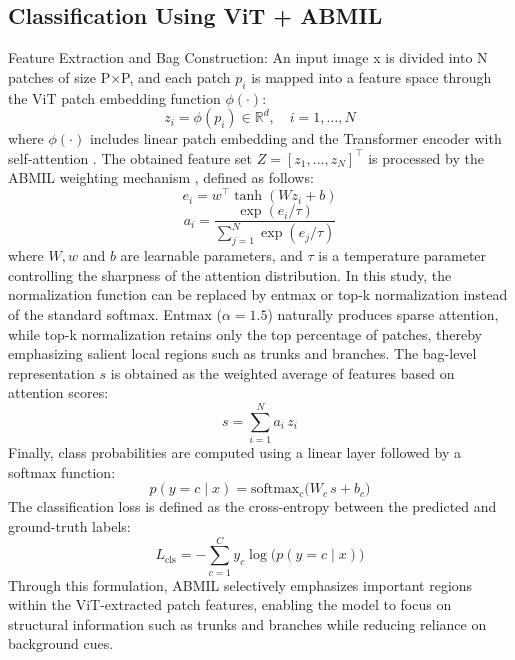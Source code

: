 \documentclass{article}
\begin{document}
\subsection{Classification Using ViT + ABMIL}
Feature Extraction and Bag Construction:
An input image x is divided into N patches of size P×P, and each patch $p_i$ is mapped into a feature space through the ViT patch embedding function $\phi(\cdot)$:
\begin{equation}\tag{1}
z_i=\phi(p_i)\in\mathbb{R}^d,\quad i=1,\dots,N
\end{equation}
where $\phi(\cdot)$ includes linear patch embedding and the Transformer encoder with self-attention \cite{ref1}. The obtained feature set $Z=[z_1,\dots,z_N ]^\top$ is processed by the ABMIL weighting mechanism \cite{ref2}, defined as follows:
\begin{equation}\tag{2}
e_i = w^\top \tanh(W z_i + b)
\end{equation}
\begin{equation}\tag{3}
a_i=\frac{\exp(e_i/\tau)}{\sum_{j=1}^{N}\exp(e_j/\tau)}
\end{equation}
where $W,w$ and $b$ are learnable parameters, and $\tau$ is a temperature parameter controlling the sharpness of the attention distribution. In this study, the normalization function can be replaced by entmax or top-k normalization instead of the standard softmax. Entmax ($\alpha = 1.5$) naturally produces sparse attention, while top-k normalization retains only the top percentage of patches, thereby emphasizing salient local regions such as trunks and branches. The bag-level representation $s$ is obtained as the weighted average of features based on attention scores:
\begin{equation}\tag{4}
s=\sum_{i=1}^{N} a_i\, z_i
\end{equation}
Finally, class probabilities are computed using a linear layer followed by a softmax function:
\begin{equation}\tag{5}
p(y=c\mid x)=\mathrm{softmax}_c\big(W_c\, s+b_c\big)
\end{equation}
The classification loss is defined as the cross-entropy between the predicted and ground-truth labels:
\begin{equation}\tag{6}
L_{\mathrm{cls}}=-\sum_{c=1}^{C} y_c \log\big(p(y=c\mid x)\big)
\end{equation}
Through this formulation, ABMIL selectively emphasizes important regions within the ViT-extracted patch features, enabling the model to focus on structural information such as trunks and branches while reducing reliance on background cues.
\end{document}

